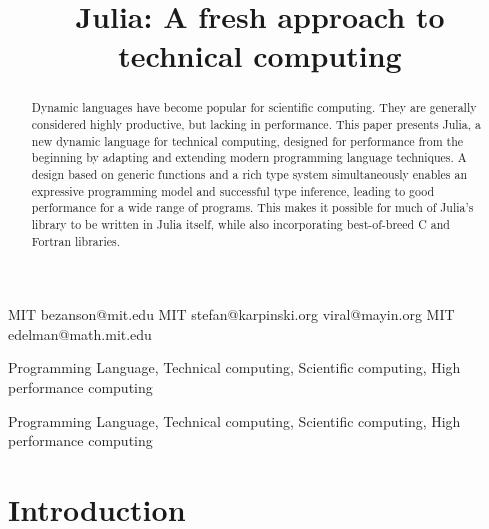 \documentclass[9pt]{sigplanconf}
\begin{document}


\title{Julia: A fresh approach to technical computing}

           {MIT}
           {bezanson@mit.edu}
           {MIT}
           {stefan@karpinski.org}
           {}
           {viral@mayin.org}
           {MIT}
           {edelman@math.mit.edu}

\maketitle
\begin{abstract}
  Dynamic languages have become popular for scientific
  computing. They are generally considered highly productive, but
  lacking in performance. This paper presents Julia, a new dynamic
  language for technical computing, designed for performance from the
  beginning by adapting and extending modern programming language
  techniques. A design based on generic functions and a rich type
  system simultaneously enables an expressive programming model and
  successful type inference, leading to good performance for a wide
  range of programs. This makes it possible for much of Julia's
  library to be written in Julia itself, while also incorporating
  best-of-breed C and Fortran libraries.
\end{abstract}


\terms
Programming Language, Technical computing, Scientific computing, High
performance computing

\keywords
Programming Language, Technical computing, Scientific computing, High
performance computing

\section{Introduction}
\end{document}
